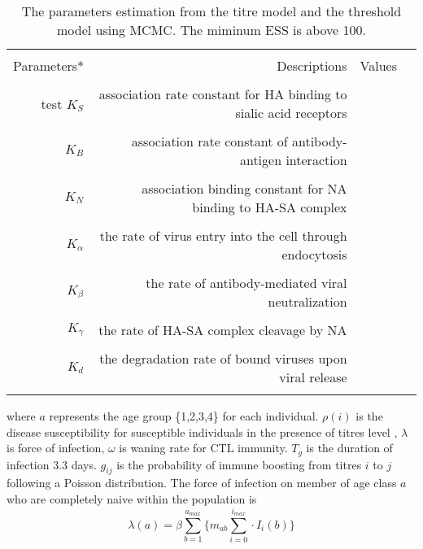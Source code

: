 \documentclass{article}
\begin{document}
\clearpage
\begin{table}[ht]
\begin{minipage}{\textwidth}      
\centering %
\caption{The parameters estimation from the titre model and the threshold model using MCMC. The miminum ESS is above 100.}
\centering %
\begin{tabular}{rrrr}

\hline\hline \\%
Parameters* &          Descriptions &       Values \\ \\
\hline %
   test
    $K_{S}$ &	   association rate constant for HA binding to sialic acid receptors	  \\ \\
    
    $K_{B}$ &      association rate constant of antibody-antigen interaction \\ \\
  
    $K_{N}$ &      association binding constant for NA binding to HA-SA complex \\ \\

    $K_{\alpha}$ & the rate of virus entry into the cell through endocytosis    \\ \\

    $K_{\beta}$ &  the rate of antibody-mediated viral neutralization  \\ \\

    $K_{\gamma}$ & the rate of HA-SA complex cleavage by NA &     \\ \\
  
    $K_{d}$ &      the degradation rate of bound viruses upon viral release  \\ \\

\hline
\end{tabular}
\end{minipage}
\end{table}


where $a$ represents the age group \{1,2,3,4\} for each individual. $\rho(i)$ is the disease susceptibility for susceptible individuals in the presence of titres level , $\lambda$ is force of infection, $\omega$ is waning rate for CTL immunity. $T_{g}$ is the duration of infection 3.3 days. $g_{ij}$ is the probability of immune boosting from titres $i$ to $j$ following a Poisson distribution. The force of infection on member of age class $a$ who are completely naive within the population is 
\begin{equation}
 \lambda(a)=\beta\sum_{b=1}^{a_{max}}{\Big\{m_{ab}\sum_{i=0}^{i_{max}}\cdot I_{i}(b)\Big\}}
\end{equation}
\end{document}
